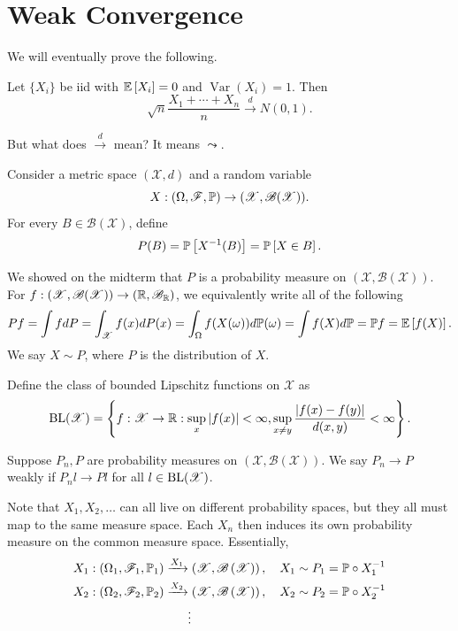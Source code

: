 \section{Weak Convergence}

We will eventually prove the following.
\begin{theorem}
	Let $\{X_i\}$ be iid with $\E\left[X_i\right] = 0$ and $\operatorname{Var}\left(X_i\right) = 1$. Then \[
		\sqrt{n} \frac{X_1+\cdots+X_n}{n} \xrightarrow{d} N(0,1)
	.\] 
\end{theorem}

But what does $\xrightarrow{d}$ mean? It means $\leadsto$.

Consider a metric space $(\mathscr{X},d)$ and a random variable
\[
	X: (\Omega, \mathscr{F}, \P) \to (\mathscr{X}, \mathscr{B}(\mathscr{X})).
\]
For every $B \in \mathscr{B}(\mathscr{X})$, define \[
	P(B) = \P\left[X^{-1}(B)\right] = \P\left[X \in B\right]
.\] 

We showed on the midterm that $P$ is a probability measure on $\left( \mathscr{X},\mathscr{B}(\mathscr{X}) \right)$. For $f: (\mathscr{X},\mathscr{B}(\mathscr{X})) \to \left( \R, \mathscr{B}_\R \right)$, we equivalently write all of the following
\begin{align*}
	Pf = \int f dP = \int_{\mathscr{X}} f(x)dP(x) = \int_\Omega f(X(\omega)) d\P(\omega) =  \int f(X) d\P = \P f = \E\left[f(X)\right] 
.\end{align*}
We say $X \sim P$, where $P$ is the distribution of $X$.

\begin{definition}
	Define the class of bounded Lipschitz functions on $\mathscr{X}$ as \[
		\BL(\mathscr{X}) = \left\{f: \mathscr{X} \to \R : \sup_x \left| f(x) \right| < \infty, \sup_{x \ne y} \frac{\left| f(x) - f(y) \right|}{d(x,y)} < \infty\right\}
	.\] 
\end{definition}

\begin{definition}
	Suppose $P_n, P$ are probability measures on $\left( \mathscr{X}, \mathscr{B}\left( \mathscr{X} \right) \right)$. We say $P_n \to P$ weakly if $P_n l \to P l$ for all $l \in \BL(\mathscr{X})$.
\end{definition}

Note that $X_1,X_2,\ldots$ can all live on different probability spaces, but they all must map to the same measure space. Each $X_n$ then induces its own probability measure on the common measure space. Essentially,
\begin{align*}
	X_1&: (\Omega_1,\mathscr{F}_1, \P_1) \xrightarrow{X_1} \left( \mathscr{X}, \mathscr{B}\left( \mathscr{X} \right) \right), \quad X_1 \sim P_1 = \P \circ X_1^{-1} \\
	X_2&: \left( \Omega_2, \mathscr{F}_2, \P_2 \right) \xrightarrow{X_2} \left( \mathscr{X}, \mathscr{B}\left( \mathscr{X} \right) \right), \quad X_2 \sim P_2 = \P \circ X_2^{-1}\\
	   & \qquad\qquad\qquad\qquad\vdots
\end{align*}

